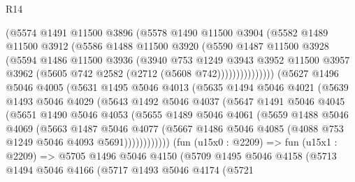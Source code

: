 \begin{lexlean}{R14}
\begin{coremodule}
                  (@5574
                    @1491
                    @11500
                    @3896
                    (@5578
                      @1490
                      @11500
                      @3904
                      (@5582
                        @1489
                        @11500
                        @3912
                        (@5586
                          @1488
                          @11500
                          @3920
                          (@5590
                            @1487
                            @11500
                            @3928
                            (@5594
                              @1486
                              @11500
                              @3936
                              (@3940
                                @753
                                @1249
                                @3943
                                @3952
                                @11500
                                @3957
                                @3962
                                (@5605 @742 @2582 (@2712 (@5608 @742)))))))))))))))
        (@5627
          @1496
          @5046
          @4005
          (@5631
            @1495
            @5046
            @4013
            (@5635
              @1494
              @5046
              @4021
              (@5639
                @1493
                @5046
                @4029
                (@5643
                  @1492
                  @5046
                  @4037
                  (@5647
                    @1491
                    @5046
                    @4045
                    (@5651
                      @1490
                      @5046
                      @4053
                      (@5655
                        @1489
                        @5046
                        @4061
                        (@5659
                          @1488
                          @5046
                          @4069
                          (@5663
                            @1487
                            @5046
                            @4077
                            (@5667 @1486 @5046 @4085 (@4088 @753 @1249 @5046 @4093 @5691))))))))))))
        (fun (u15x0 : @2209) =>
        fun (u15x1 : @2209) =>
        @5705
          @1496
          @5046
          @4150
          (@5709
            @1495
            @5046
            @4158
            (@5713
              @1494
              @5046
              @4166
              (@5717
                @1493
                @5046
                @4174
                (@5721

\end{coremodule}
\end{lexlean}
